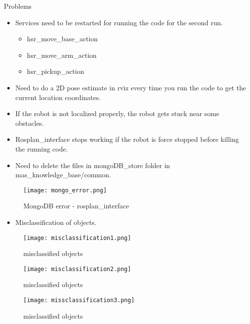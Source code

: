 \documentclass[aspectratio=169]{beamer}
\begin{document}
\begin{frame}{Problems}
  \begin{itemize}
      \item Services need to be restarted for running the code for the second run.
      \begin{itemize}
          \item hsr\_move\_base\_action
          \item hsr\_move\_arm\_action
          \item hsr\_pickup\_action
      \end{itemize}
      \item Need to do a 2D pose estimate in rviz every time you run the code to get the current location coordinates.
      \item If the robot is not localized properly, the robot gets stuck near some obstacles.
  \end{itemize}
\end{frame}

\begin{frame}{}
    \begin{itemize}
      \item Rosplan\_interface stops working if the robot is force stopped before killing the running code.
      \item Need to delete the files in mongoDB\_store folder in mas\_knowledge\_base/common.
    \end{itemize}
    \begin{figure}
        \centering
        \texttt{[image: mongo\_error.png]}
        \caption{MongoDB error - rosplan\_interface}
        \label{fig:my_label}
    \end{figure}
\end{frame}

\begin{frame}{}
    \begin{itemize}
        \item Misclassification of objects.
    \end{itemize}
    \begin{multicols}{3}
        \begin{figure}
            \centering
            \texttt{[image: misclassification1.png]}
            \caption{misclassified objects}
            \label{fig:my_label}
        \end{figure}
        \begin{figure}
            \centering
            \texttt{[image: misclassification2.png]}
            \caption{misclassified objects}
            \label{fig:my_label}
        \end{figure}
        \begin{figure}
            \centering
            \texttt{[image: missclassification3.png]}
            \caption{misclassified objects}
            \label{fig:my_label}
        \end{figure}
    \end{multicols}
\end{frame}
\end{document}
